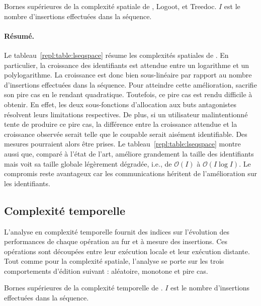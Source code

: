\begin{table}
  \begin{center}
    \caption[Bornes supérieures de la complexité spatiale de \LSEQ, Logoot, et
    Treedoc] {\label{repl:table:lseqspace} Bornes supérieures de la complexité
      spatiale de \LSEQ, Logoot, et Treedoc. $I$ est le nombre d'insertions
      effectuées dans la séquence.}
    
  \end{center}
\end{table}

\paragraph{Résumé.} Le tableau~\ref{repl:table:lseqspace} résume les complexités
spatiales de \LSEQ. En particulier, la croissance des identifiants est attendue
entre un logarithme et un polylogarithme. La croissance est donc bien
sous-linéaire par rapport au nombre d'insertions effectuées dans la séquence. Pour
atteindre cette amélioration, \LSEQ sacrifie son pire cas en le rendant
quadratique. Toutefois, ce pire cas est rendu difficile à obtenir. En effet, les
deux sous-fonctions d'allocation aux buts antagonistes résolvent leurs
limitations respectives. De plus, si un utilisateur malintentionné tente de
produire ce pire cas, la différence entre la croissance attendue et la
croissance observée serait telle que le coupable serait aisément
identifiable. Des mesures pourraient alors être prises. Le
tableau~\ref{repl:table:lseqspace} montre aussi que, comparé à l'état de l'art,
\LSEQ améliore grandement la taille des identifiants mais voit sa taille globale
légèrement dégradée, i.e., de $\mathcal{O}(I)$ à $\mathcal{O}(I\log I)$. Le
compromis reste avantageux car les communications héritent de l'amélioration sur
les identifiants.

\subsection{Complexité temporelle}

L'analyse en complexité temporelle fournit des indices sur l'évolution des
performances de chaque opération au fur et à mesure des insertions. Ces
opérations sont découpées entre leur exécution locale et leur exécution
distante. Tout comme pour la complexité spatiale, l'analyse se porte sur les
trois comportements d'édition suivant : aléatoire, monotone et pire cas.

\begin{table}
  \begin{center}
    \caption[Bornes supérieures de la complexité temporelle de \LSEQ]
    {\label{repl:table:lseqtime} Bornes supérieures de la complexité temporelle
      de \LSEQ. $I$ est le nombre d'insertions effectuées dans la séquence.}
    
  \end{center}
\end{table}


